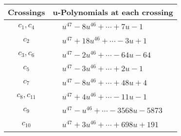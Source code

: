 \documentclass[1p]{elsarticle_modified}
\theoremstyle{definition}
\begin{document}
\begin{tabular}{m{50pt}|m{274pt}}
Crossings & \hspace{64pt}u-Polynomials at each crossing \\
\hline $$\begin{aligned}c_{1},c_{4}\end{aligned}$$&$\begin{aligned}
&u^{47}-8 u^{46}+\cdots+7 u-1
\end{aligned}$\\
\hline $$\begin{aligned}c_{2}\end{aligned}$$&$\begin{aligned}
&u^{47}+18 u^{46}+\cdots-3 u+1
\end{aligned}$\\
\hline $$\begin{aligned}c_{3},c_{6}\end{aligned}$$&$\begin{aligned}
&u^{47}-2 u^{46}+\cdots-64 u-64
\end{aligned}$\\
\hline $$\begin{aligned}c_{5}\end{aligned}$$&$\begin{aligned}
&u^{47}-3 u^{46}+\cdots+2 u-1
\end{aligned}$\\
\hline $$\begin{aligned}c_{7}\end{aligned}$$&$\begin{aligned}
&u^{47}-8 u^{46}+\cdots+48 u+4
\end{aligned}$\\
\hline $$\begin{aligned}c_{8},c_{11}\end{aligned}$$&$\begin{aligned}
&u^{47}+4 u^{46}+\cdots-11 u-1
\end{aligned}$\\
\hline $$\begin{aligned}c_{9}\end{aligned}$$&$\begin{aligned}
&u^{47}- u^{46}+\cdots-3568 u-5873
\end{aligned}$\\
\hline $$\begin{aligned}c_{10}\end{aligned}$$&$\begin{aligned}
&u^{47}+3 u^{46}+\cdots+698 u+191
\end{aligned}$\\
\hline
\end{tabular}\\~\\
\end{document}

